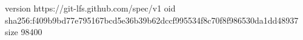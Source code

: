 version https://git-lfs.github.com/spec/v1
oid sha256:f409b9bd77e795167bcd5e36b39b62dccf995534f8c70f8f986530da1dd48937
size 98400
